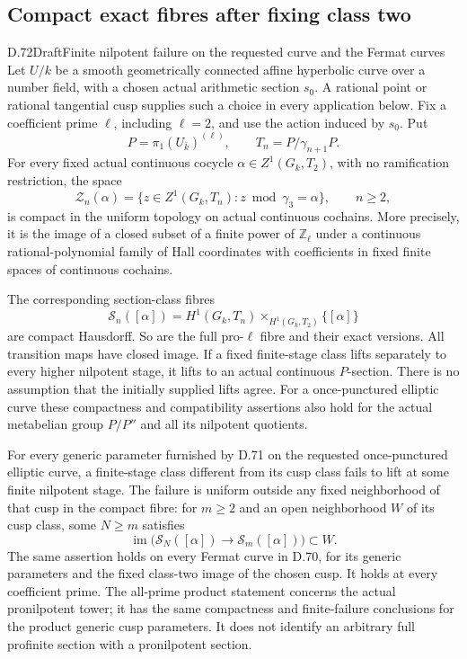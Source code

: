\subsection{Compact exact fibres after fixing class two}

\begin{statement}{D.72}{Draft}{Finite nilpotent failure on the requested curve and the Fermat curves}
Let \(U/k\) be a smooth geometrically connected affine hyperbolic
curve over a number field, with a chosen actual arithmetic section
\(s_0\). A rational point or rational tangential cusp supplies such
a choice in every application below. Fix a coefficient prime
\(\ell\), including \(\ell=2\), and use the action induced by \(s_0\).
Put
\[
 P=\pi_1(U_{\bar k})^{(\ell)},\qquad
 T_n=P/\gamma_{n+1}P.
                                                        \tag{D.72.1}
\]
For every fixed actual continuous cocycle
\(\alpha\in Z^1(G_k,T_2)\), with no ramification restriction,
the space
\[
 {\mathscr Z}_n(\alpha)=
   \{z\in Z^1(G_k,T_n):z\bmod\gamma_3=\alpha\},
                 \qquad n\ge2,                         \tag{D.72.2}
\]
is compact in the uniform topology on actual continuous cochains.
More precisely, it is the image of a closed subset of a finite
power of \(\mathbb Z_\ell\) under a continuous rational-polynomial
family of Hall coordinates with coefficients in fixed finite
spaces of continuous cochains.

The corresponding section-class fibres
\[
 {\mathscr S}_n([\alpha])=
   H^1(G_k,T_n)\mathbin{\times}_{H^1(G_k,T_2)}\{[\alpha]\}
                                                        \tag{D.72.3}
\]
are compact Hausdorff. So are the full pro-\(\ell\) fibre and
their exact versions. All transition maps have closed image.
If a fixed finite-stage class lifts separately to every higher
nilpotent stage, it lifts to an actual continuous \(P\)-section.
There is no assumption that the initially supplied lifts agree.
For a once-punctured elliptic curve these compactness and
compatibility assertions also hold for the actual metabelian
group \(P/P''\) and all its nilpotent quotients.

For every generic parameter furnished by D.71 on the requested
once-punctured elliptic curve, a finite-stage class different
from its cusp class fails to lift at some finite nilpotent stage.
The failure is uniform outside any fixed neighborhood of that
cusp in the compact fibre: for \(m\ge2\) and an open neighborhood
\(W\) of its cusp class, some \(N\ge m\) satisfies
\[
  \operatorname{im}\bigl({\mathscr S}_N([\alpha])
            \longrightarrow{\mathscr S}_m([\alpha])\bigr)
                      \subset W.                       \tag{D.72.4}
\]
The same assertion holds on every Fermat curve in D.70, for
its generic parameters and the fixed class-two image of the
chosen cusp. It holds at every coefficient prime. The all-prime
product statement concerns the actual pronilpotent tower; it
has the same compactness and finite-failure conclusions for
the product generic cusp parameters. It does not identify an
arbitrary full profinite section with a pronilpotent section.


\end{statement}
